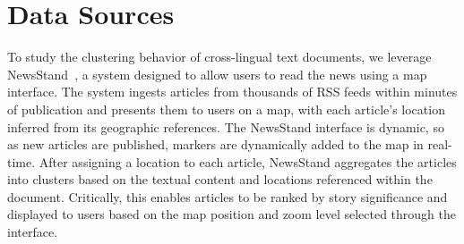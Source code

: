 \section{Data Sources}\label{section:data}

To study the clustering behavior of cross-lingual text documents, we leverage NewsStand~\cite{Teit08}, a system designed to allow users to read the news using a map interface. 
The system ingests articles from thousands of RSS feeds within minutes of publication and presents them to users on a map, with each article's location inferred from its geographic references. 
The NewsStand interface is dynamic, so as new articles are published, markers are dynamically added to the map in real-time. 
After assigning a location to each article, NewsStand aggregates the articles into clusters based on the textual content and locations referenced within the document. Critically, this enables articles to be ranked by story significance and displayed to users based on the map position and zoom level selected through the interface.



